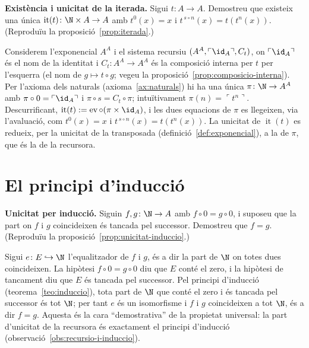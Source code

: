 \begin{exercici}
\textbf{Existència i unicitat de la iterada.} Sigui \(t\colon A\to A\). Demostreu que existeix una única \(\operatorname{it}(t)\colon\N\times A\to A\) amb \(t^{0}(x)=x\) i \(t^{\,s\circ n}(x)=t(t^{n}(x))\). (Reproduïu la proposició~\ref{prop:iterada}.)
\end{exercici}
\begin{solucio}
Considerem l'exponencial \(A^{A}\) i el sistema recursiu \((A^{A},\ulcorner\id_A\urcorner,C_t)\), on \(\ulcorner\id_A\urcorner\) és el nom de la identitat i \(C_t\colon A^{A}\to A^{A}\) és la composició interna per \(t\) per l'esquerra (el nom de \(g\mapsto t\circ g\); vegeu la proposició~\ref{prop:composicio-interna}). Per l'axioma dels naturals (axioma~\ref{ax:naturals}) hi ha una única \(\pi\colon\N\to A^{A}\) amb \(\pi\circ0=\ulcorner\id_A\urcorner\) i \(\pi\circ s=C_t\circ\pi\); intuïtivament \(\pi(n)=\ulcorner t^{n}\urcorner\). Descurrificant, \(\operatorname{it}(t):=\operatorname{ev}\circ(\pi\times\id_A)\), i les dues equacions de \(\pi\) es llegeixen, via l'avaluació, com \(t^{0}(x)=x\) i \(t^{\,s\circ n}(x)=t(t^{n}(x))\). La unicitat de \(\operatorname{it}(t)\) es redueix, per la unicitat de la transposada (definició~\ref{def:exponencial}), a la de \(\pi\), que és la de la recursora.
\end{solucio}

\section{El principi d'inducció}\label{prac:induccio}

\begin{exercici}
\textbf{Unicitat per inducció.} Siguin \(f,g\colon\N\to A\) amb \(f\circ0=g\circ0\), i suposeu que la part on \(f\) i \(g\) coincideixen és tancada pel successor. Demostreu que \(f=g\). (Reproduïu la proposició~\ref{prop:unicitat-induccio}.)
\end{exercici}
\begin{solucio}
Sigui \(e\colon E\hookrightarrow\N\) l'equalitzador de \(f\) i \(g\), és a dir la part de \(\N\) on totes dues coincideixen. La hipòtesi \(f\circ0=g\circ0\) diu que \(E\) conté el zero, i la hipòtesi de tancament diu que \(E\) és tancada pel successor. Pel principi d'inducció (teorema~\ref{teo:induccio}), tota part de \(\N\) que conté el zero i és tancada pel successor és tot \(\N\); per tant \(e\) és un isomorfisme i \(f\) i \(g\) coincideixen a tot \(\N\), és a dir \(f=g\). Aquesta és la cara \enquote{demostrativa} de la propietat universal: la part d'unicitat de la recursora és exactament el principi d'inducció (observació~\ref{obs:recursio-i-induccio}).
\end{solucio}


